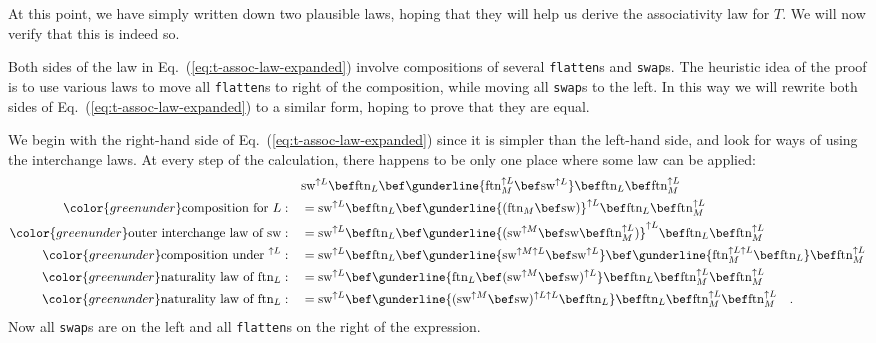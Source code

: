 At this point, we have simply written down two plausible laws, hoping
that they will help us derive the associativity law for $T$. We will
now verify that this is indeed so.

Both sides of the law in Eq.~(\ref{eq:t-assoc-law-expanded}) involve
compositions of several \lstinline!flatten!s and \lstinline!swap!s.
The heuristic idea of the proof is to use various laws to move all
\lstinline!flatten!s to right of the composition, while moving all
\lstinline!swap!s to the left. In this way we will rewrite both sides
of Eq.~(\ref{eq:t-assoc-law-expanded}) to a similar form, hoping
to prove that they are equal.

We begin with the right-hand side of Eq.~(\ref{eq:t-assoc-law-expanded})
since it is simpler than the left-hand side, and look for ways of
using the interchange laws. At every step of the calculation, there
happens to be only one place where some law can be applied:
\begin{align*}
 & \text{sw}^{\uparrow L}\bef\text{ftn}_{L}\bef\gunderline{\text{ftn}_{M}^{\uparrow L}\bef\text{sw}^{\uparrow L}}\bef\text{ftn}_{L}\bef\text{ftn}_{M}^{\uparrow L}\\
{\color{greenunder}\text{composition for }L:}\quad & =\text{sw}^{\uparrow L}\bef\text{ftn}_{L}\bef\gunderline{(\text{ftn}_{M}\bef\text{sw})}^{\uparrow L}\bef\text{ftn}_{L}\bef\text{ftn}_{M}^{\uparrow L}\\
{\color{greenunder}\text{outer interchange law of }\text{sw}:}\quad & =\text{sw}^{\uparrow L}\bef\text{ftn}_{L}\bef\gunderline{(\text{sw}^{\uparrow M}\bef\text{sw}\bef\text{ftn}_{M}^{\uparrow L})}^{\uparrow L}\bef\text{ftn}_{L}\bef\text{ftn}_{M}^{\uparrow L}\\
{\color{greenunder}\text{composition under }^{\uparrow L}:}\quad & =\text{sw}^{\uparrow L}\bef\text{ftn}_{L}\bef\gunderline{\text{sw}^{\uparrow M\uparrow L}\bef\text{sw}^{\uparrow L}}\bef\gunderline{\text{ftn}_{M}^{\uparrow L\uparrow L}\bef\text{ftn}_{L}}\bef\text{ftn}_{M}^{\uparrow L}\\
{\color{greenunder}\text{naturality law of }\text{ftn}_{L}:}\quad & =\text{sw}^{\uparrow L}\bef\gunderline{\text{ftn}_{L}\bef(\text{sw}^{\uparrow M}\bef\text{sw})^{\uparrow L}}\bef\text{ftn}_{L}\bef\text{ftn}_{M}^{\uparrow L}\bef\text{ftn}_{M}^{\uparrow L}\\
{\color{greenunder}\text{naturality law of }\text{ftn}_{L}:}\quad & =\text{sw}^{\uparrow L}\bef\gunderline{(\text{sw}^{\uparrow M}\bef\text{sw})^{\uparrow L\uparrow L}\bef\text{ftn}_{L}}\bef\text{ftn}_{L}\bef\text{ftn}_{M}^{\uparrow L}\bef\text{ftn}_{M}^{\uparrow L}\quad.
\end{align*}
Now all \lstinline!swap!s are on the left and all \lstinline!flatten!s
on the right of the expression.

